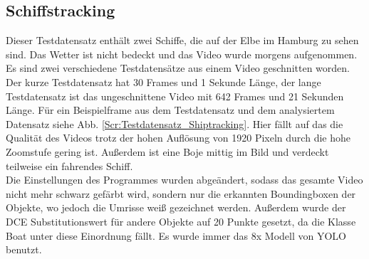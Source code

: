 \subsection{Schiffstracking \label{ev:shiptracking}}
{ 
	Dieser Testdatensatz enthält zwei Schiffe, die auf der Elbe im Hamburg zu sehen sind. Das Wetter ist nicht bedeckt und das Video wurde morgens aufgenommen. Es sind zwei verschiedene Testdatensätze aus einem Video geschnitten worden. Der kurze Testdatensatz hat 30 Frames und 1 Sekunde Länge, der lange Testdatensatz ist das ungeschnittene Video mit 642 Frames und 21 Sekunden Länge. Für ein Beispielframe aus dem Testdatensatz und dem analysiertem Datensatz siehe Abb. \ref{Scr:Testdatensatz_Shiptracking}. Hier fällt auf das die Qualität des Videos trotz der hohen Auflösung von 1920  Pixeln durch die hohe Zoomstufe gering ist. Außerdem ist eine Boje mittig im Bild und verdeckt teilweise ein fahrendes Schiff. \\
	Die Einstellungen des Programmes wurden abgeändert, sodass das gesamte Video nicht mehr schwarz gefärbt wird, sondern nur die erkannten Boundingboxen der Objekte, wo jedoch die Umrisse weiß gezeichnet werden. Außerdem wurde der DCE Substitutionswert für andere Objekte auf 20 Punkte gesetzt, da die Klasse \glqq Boat\grqq{} unter diese Einordnung fällt. Es wurde immer das 8x Modell von YOLO benutzt. \\

}
